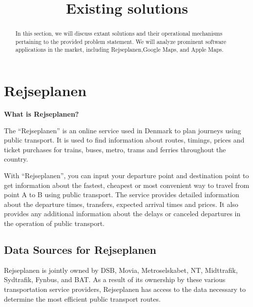 \documentclass[11pt]{article}
\title{Existing solutions}
\begin{document}
    \maketitle
    \begin{abstract}
        In this section, we will discuss extant solutions and their operational mechanisms pertaining to the provided
        problem statement.
        We will analyze prominent software applications in the market,
        including Rejseplanen,Google Maps, and Apple Maps.
    \end{abstract}


    \section{Rejseplanen}\label{sec:rejseplanen}

    \textbf{What is Rejseplanen?}

    The ``Rejseplanen'' is an online service used in Denmark to plan journeys using public transport.
    It is used to find information about routes, timings, prices and ticket purchases for trains, buses, metro, trams and ferries
    throughout the country. \newline

    With ``Rejseplanen'', you can input your departure point and destination point to get information about the fastest,
    cheapest or most convenient way to travel from point A to B using public transport.
    The service provides detailed information about the departure times, transfers, expected arrival times and prices.
    It also provides any additional information about the delays or canceled departures in the operation of public transport.\newline

    \subsection{Data Sources for Rejseplanen}\label{subsec:where-does-rejseplanen-get-their-data-from?}

    Rejseplanen is jointly owned by DSB, Movia, Metroselskabet, NT, Midttrafik, Sydtrafik, Fynbus, and BAT.
    As a result of its ownership by these various transportation service providers, Rejseplanen has access to the
    data necessary to determine the most efficient public transport routes.
\end{document}
